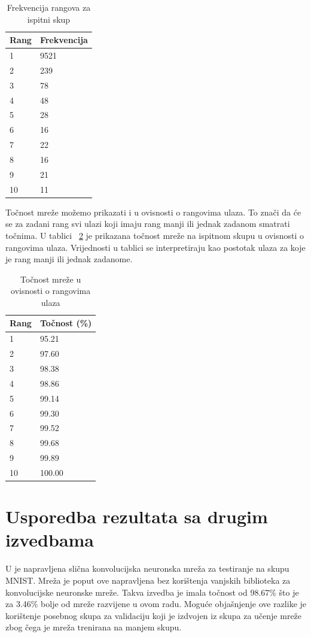 \documentclass[times, utf8, zavrsni, numeric]{fer}
\begin{document}
\begin{table}
\caption{Frekvencija rangova za ispitni skup}
\label{tbl:rangovi}
\centering
\begin{tabular}{ll} \hline
Rang & Frekvencija \\ \hline
1 & 9521 \\
2 & 239 \\
3 & 78 \\
4 & 48 \\
5 & 28 \\
6 & 16 \\
7 & 22 \\
8 & 16 \\
9 & 21 \\
10 & 11 \\ \hline
\end{tabular}
\end{table}

Točnost mreže možemo prikazati i u ovisnosti o rangovima ulaza. To znači da će se za zadani rang svi ulazi koji imaju rang manji ili jednak zadanom smatrati točnima. U tablici ~\ref{tbl:tocnost-rangovi} je prikazana točnost mreže na ispitnom skupu u ovisnosti o rangovima ulaza. Vrijednosti u tablici se interpretiraju kao postotak ulaza za koje je rang manji ili jednak zadanome.

\begin{table}
\caption{Točnost mreže u ovisnosti o rangovima ulaza}
\label{tbl:tocnost-rangovi}
\centering
\begin{tabular}{ll} \hline
Rang & Točnost (\%) \\ \hline
1 & 95.21 \\
2 & 97.60 \\
3 & 98.38 \\
4 & 98.86 \\
5 & 99.14 \\
6 & 99.30 \\
7 & 99.52 \\
8 & 99.68 \\
9 & 99.89 \\
10 & 100.00 \\ \hline
\end{tabular}
\end{table}

\section{Usporedba rezultata sa drugim izvedbama}
U \citep{vukoticraspoznavanje} je napravljena slična konvolucijska neuronska mreža za testiranje na skupu MNIST. Mreža je poput ove napravljena bez korištenja vanjskih biblioteka za konvolucijske neuronske mreže. Takva izvedba je imala točnost od 98.67\% što je za 3.46\% bolje od mreže razvijene u ovom radu. Moguće objašnjenje ove razlike je korištenje posebnog skupa za validaciju koji je izdvojen iz skupa za učenje mreže zbog čega je mreža trenirana na manjem skupu. 
\end{document}
